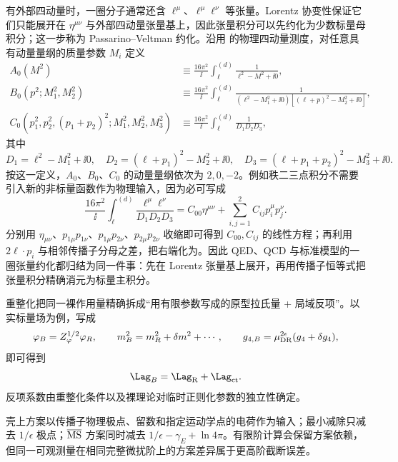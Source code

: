 有外部四动量时，一圈分子通常还含 $\ell^\mu$、$\ell^\mu\ell^\nu$ 等张量。Lorentz 协变性保证它们只能展开在 $\eta^{\mu\nu}$ 与外部四动量张量基上，因此张量积分可以先约化为少数标量母积分；这一步称为 Passarino--Veltman 约化。沿用 的物理四动量测度，对任意具有动量量纲的质量参数 $M_i$ 定义
\begin{equation}
\boxed{
\begin{aligned}
 A_0(M^2)
 &\equiv \frac{16\pi^2}{\ii}\int_\ell^{(d)}
 \frac{1}{\ell^2-M^2+\ii0},\\
 B_0(p^2;M_1^2,M_2^2)
 &\equiv \frac{16\pi^2}{\ii}\int_\ell^{(d)}
 \frac{1}{(\ell^2-M_1^2+\ii0)[(\ell+p)^2-M_2^2+\ii0]},\\
 C_0(p_1^2,p_2^2,(p_1+p_2)^2;M_1^2,M_2^2,M_3^2)
 &\equiv \frac{16\pi^2}{\ii}\int_\ell^{(d)}
 \frac{1}{D_1D_2D_3},
\end{aligned}}
\label{eq:pv-scalar-masters-dp90}
\end{equation}
其中
\[
D_1=\ell^2-M_1^2+\ii0,\quad
D_2=(\ell+p_1)^2-M_2^2+\ii0,\quad
D_3=(\ell+p_1+p_2)^2-M_3^2+\ii0.
\]
按这一定义，$A_0$、$B_0$、$C_0$ 的动量量纲依次为 $2,0,-2$。例如秩二三点积分不需要引入新的非标量函数作为物理输入，因为必可写成
\begin{equation}
\frac{16\pi^2}{\ii}\int_\ell^{(d)}\frac{\ell^\mu\ell^\nu}{D_1D_2D_3}
=C_{00}\eta^{\mu\nu}+\sum_{i,j=1}^{2}C_{ij}p_i^\mu p_j^\nu .
\label{eq:pv-rank2-decomposition-dp90}
\end{equation}
分别用 $\eta_{\mu\nu}$、$p_{1\mu}p_{1\nu}$、$p_{1\mu}p_{2\nu}$、$p_{2\mu}p_{2\nu}$ 收缩即可得到 $C_{00},C_{ij}$ 的线性方程；再利用 $2\ell\!\cdot p_i$ 与相邻传播子分母之差，把右端化为。因此 QED、QCD 与标准模型的一圈张量约化都归结为同一件事：先在 Lorentz 张量基上展开，再用传播子恒等式把张量积分精确消元为标量主积分。

重整化把同一裸作用量精确拆成“用有限参数写成的原型拉氏量 + 局域反项”。以实标量场为例，写成
\begin{equation*}
 \varphi_B=Z_\varphi^{1/2}\varphi_R,
 \qquad
 m_B^2=m_R^2+\delta m^2+\cdots,
 \qquad
 g_{4,B}=\mu_{\rm DR}^{2\epsilon}(g_4+\delta g_4),
\end{equation*}
即可得到
\begin{equation*}
 \Lag_B=\Lag_{\rm R}+\Lag_{\rm ct}.
\end{equation*}
反项系数由重整化条件以及裸理论对临时正则化参数的独立性确定。

\begin{note}[常用重整化方案]
壳上方案以传播子物理极点、留数和指定运动学点的电荷作为输入；最小减除只减去 \(1/\epsilon\) 极点；\(\overline{\rm MS}\) 方案同时减去 \(1/\epsilon-\gamma_E+\ln4\pi\)。有限阶计算会保留方案依赖，但同一可观测量在相同完整微扰阶上的方案差异属于更高阶截断误差。
\end{note}


